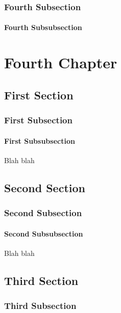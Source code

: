 \documentclass[11pt]{book}
\begin{document}
\subsection{Fourth Subsection}

\subsubsection{Fourth Subsubsection}

\chapter{Fourth Chapter}

\section{First Section}

\subsection{First Subsection}

\subsubsection{First Subsubsection}

Blah blah

\section{Second Section}

\subsection{Second Subsection}

\subsubsection{Second Subsubsection}

Blah blah

\section{Third Section}

\subsection{Third Subsection}
\end{document}

